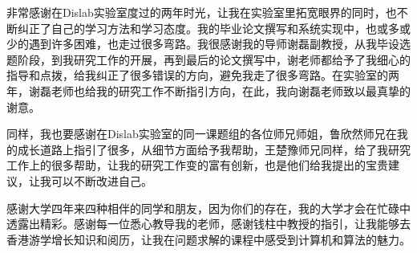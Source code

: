 \documentclass[winfonts]{njuthesis}
\begin{document}
	

	\begin{acknowledgement}
		
		非常感谢在Dislab实验室度过的两年时光，让我在实验室里拓宽眼界的同时，也不断纠正了自己的学习方法和学习态度。我的毕业论文撰写和系统实现中，也或多或少的遇到许多困难，也走过很多弯路。我很感谢我的导师谢磊副教授，从我毕设选题阶段，到我研究工作的开展，再到最后的论文撰写中，谢老师都给予了我细心的指导和点拨，给我纠正了很多错误的方向，避免我走了很多弯路。在实验室的两年，谢磊老师也给我的研究工作不断指引方向，在此，我向谢磊老师致以最真挚的谢意。
		
		同样，我也要感谢在Dislab实验室的同一课题组的各位师兄师姐，鲁欣然师兄在我的成长道路上指引了很多，从细节方面给予我帮助，王楚豫师兄同样，给了我研究工作上的很多帮助，让我的研究工作变的富有创新，也是他们给我提出的宝贵建议，让我可以不断改进自己。
		
		感谢大学四年来四种相伴的同学和朋友，因为你们的存在，我的大学才会在忙碌中透露出精彩。感谢每一位悉心教导我的老师，感谢钱柱中教授的指引，让我能够去香港游学增长知识和阅历，让我在问题求解的课程中感受到计算机和算法的魅力。
		
	\end{acknowledgement}
\end{document}
